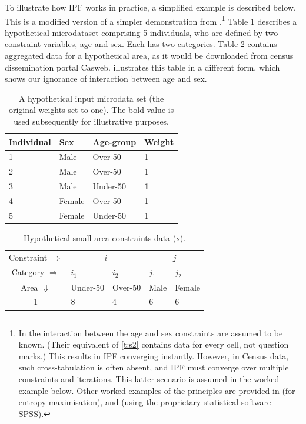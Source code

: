 \documentclass[a4paper,10pt]{article}
\begin{document}
To illustrate how IPF works in practice, a simplified example is described below.
This is a modified version of a simpler demonstration from
\citet{Ballas2005c}.\footnote{In \citet{Ballas2005c}
the interaction between the age and sex constraints are assumed to be known.
(Their equivalent of \cref{t:s2} contains data for every cell,
not question marks.) This results in IPF converging instantly.
However, in Census data, such cross-tabulation is
often absent, and IPF must converge over multiple constraints and
iterations. This latter scenario is assumed in the worked example below. Other
worked examples of the principles are provided in \citet[Appendix
3]{johnston1985geography} (for entropy maximisation), \citet{Norman1999a} and
\citet{Simpson2005} (using the proprietary statistical software SPSS).
}
Table \ref{t:w}  describes a
hypothetical microdataset comprising 5 individuals, who are defined by two
constraint variables, age and sex. Each has two categories.
Table \ref{t:s} contains aggregated data
for a hypothetical area, as it would be downloaded from census dissemination
portal Casweb.  illustrates this table in a different form,
which shows our ignorance of interaction between age and sex.


\begin{table}[h]
\centering
\caption[A hypothetical input microdata set]{A
hypothetical input microdata set (the original
weights set to one). The bold value is used subsequently for
illustrative purposes.}
\begin{tabular}{llll}
\toprule
{Individual } & {Sex} & {Age-group} & {Weight} \\
\midrule
1 & Male & Over-50 & 1 \\
2 & Male & Over-50 & 1 \\
3 & {Male} & {Under-50} & \textbf{1} \\
4 & Female & Over-50 & 1 \\
5 & Female & Under-50 & 1 \\
\bottomrule
\end{tabular}
\label{t:w}
\end{table}
\vspace{1cm}


\begin{table}[htbp]
\centering
\caption{Hypothetical small area constraints data ($s$).}
\begin{tabular}{cllll}
\toprule
Constraint $\Rightarrow$ & \multicolumn{2}{c}{$i$}& \multicolumn{2}{c}{$j$}\\
Category $\Rightarrow$ & $i_1$ & $i_2$ & $j_1$ & $j_2$ \\
Area $\Downarrow$  & Under-50 & Over-50 &  Male & Female\\
1  & 8 & 4 & 6 & 6\\
\bottomrule
\end{tabular}
\label{t:s}
\end{table}
\vspace{1cm}
\end{document}
